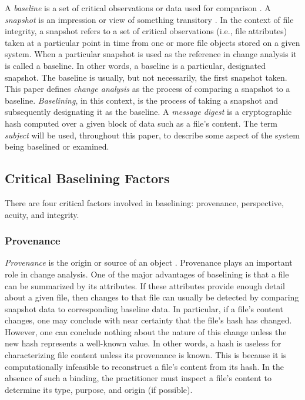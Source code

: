 \documentclass[10pt]{article}
\begin{document}
A {\it baseline} is a set of critical observations or data used for
comparison \cite{dictionary}.  A {\it snapshot} is an impression or
view of something transitory \cite{dictionary}.  In the context of
file integrity, a snapshot refers to a set of critical observations
(i.e., file attributes) taken at a particular point in time from one
or more file objects stored on a given system.  When a particular
snapshot is used as the reference in change analysis it is called a
baseline.  In other words, a baseline is a particular, designated
snapshot.  The baseline is usually, but not necessarily, the first
snapshot taken.  This paper defines {\it change analysis} as the
process of comparing a snapshot to a baseline.  {\it Baselining}, in
this context, is the process of taking a snapshot and subsequently
designating it as the baseline.  A {\it message digest} is a
cryptographic hash computed over a given block of data such as a
file's content.  The term {\it subject} will be used, throughout this
paper, to describe some aspect of the system being baselined or
examined.

\subsection{Critical Baselining Factors}

There are four critical factors involved in baselining: provenance,
perspective, acuity, and integrity.

\subsubsection{Provenance}

{\it Provenance} is the origin or source of an object
\cite{dictionary}.  Provenance plays an important role in change
analysis.  One of the major advantages of baselining is that a file
can be summarized by its attributes.  If these attributes provide
enough detail about a given file, then changes to that file can
usually be detected by comparing snapshot data to corresponding
baseline data.  In particular, if a file's content changes, one may
conclude with near certainty that the file's hash has changed.
However, one can conclude nothing about the nature of this change
unless the new hash represents a well-known value.  In other words, a
hash is useless for characterizing file content unless its provenance
is known.  This is because it is computationally infeasible to
reconstruct a file's content from its hash.  In the absence of such a
binding, the practitioner must inspect a file's content to determine
its type, purpose, and origin (if possible).
\end{document}
